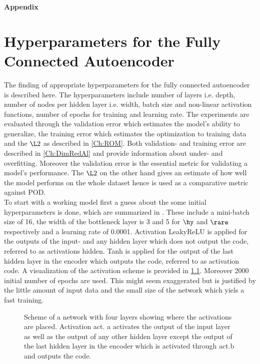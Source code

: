 

\begin{center}
	{\sffamily \bfseries\Large Appendix}\\
\end{center}%
\vspace{1cm}
\chapter{Hyperparameters for the Fully Connected Autoencoder}
\label{Ch:ApA}

The finding of appropriate hyperparameters for the fully connected autoencoder is described here. The hyperparameters include number of layers i.e. depth, number of nodes per hidden layer i.e. width, batch size and non-linear activation functions, number of epochs for training and learning rate. The experiments are evaluated through the validation error which estimates the model's ability to generalize, the training error which estimates the optimization to training data and the $\L2$ as described in \cref{Ch:ROM}. Both validation- and training error are described in \cref{Ch:DimRedAl} and provide information about under- and overfitting. Moreover the validation error is the essential metric for validating a model's performance. The $\L2$ on the other hand gives an estimate of how well the model performs on the whole dataset hence is used as a comparative metric against POD.\\ 
To start with a working model first a guess about the some initial hyperparameters is done, which are summarized in . These include a mini-batch size of 16, the width of the bottleneck layer is 3 and 5  for \(\hy\) and \(\rare\) respectively and a learning rate of 0.0001. Activation LeakyReLU is applied for the outputs of the input- and  any hidden layer which does not output the code, referred to as activations hidden. Tanh is applied for the output of the last hidden layer in the encoder which outputs the code, referred to as activation code. A visualization of the activation scheme is provided in \cref{Fig:ActScheme}. Moreover 2000 initial number of epochs are used. This might seem exaggerated but is justified by the little amount of input data and the small size of the network which yiels a fast training.
\begin{center}
	\begin{figure}[H]
		\centering
		
		\caption{\footnotesize Scheme of a network with four layers showing where the activations are placed. Activation act. a activates the output of the input layer as well as the output of any other hidden layer except the output of the last hidden layer in the encoder which is activated through act.b and outputs the code.}
		\label{Fig:ActScheme}
		\end{figure}
\end{center}
